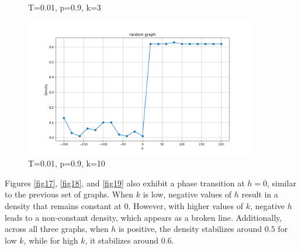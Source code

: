 \documentclass[11pt]{book}
\begin{document}
\begin{figure}
\begin{minipage}{0.45\textwidth}
        \caption{T=0.01, p=0.9, k=3}
        \label{fig18}
    \end{minipage}
    \begin{minipage}{0.45\textwidth}
        \centering
        \includegraphics[width=0.9\textwidth]{rg. T=0.01 p=0.9 k=10.png} %
        \caption{T=0.01, p=0.9, k=10}
        \label{fig19}
    \end{minipage}\hfill
\end{figure}
Figures \eqref{fig17}, \eqref{fig18}, and \eqref{fig19} also exhibit a phase transition at $h=0$, similar to the previous set of graphs. When $k$ is low, negative values of $h$ result in a density that remains constant at $0$. However, with higher values of $k$, negative $h$ leads to a non-constant density, which appears as a broken line. Additionally, across all three graphs, when $h$ is positive, the density stabilizes around $0.5$ for low $k$, while for high $k$, it stabilizes around $0.6$.
\end{document}
